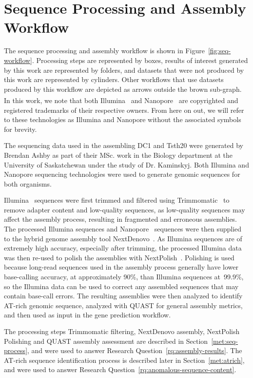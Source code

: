 \section{Sequence Processing and Assembly Workflow}\label{met:seq-workflow}

The sequence processing and assembly workflow is shown in Figure~\ref{fig:seq-workflow}. Processing steps are represented by boxes,
results of interest generated by this work are represented by folders,
and datasets that were not produced by this work are represented by
cylinders. Other workflows that use datasets produced by this workflow
are depicted as arrows outside the brown sub-graph. In this work, we note that both Illumina~\textsuperscript{\textcopyright\textregistered} and Nanopore~\textsuperscript{\textcopyright\textregistered} are copyrighted and registered trademarks of their respective owners. From here on out, we will refer to these technologies as Illumina and Nanopore without the associated symbols for brevity.

The sequencing data used in the assembling DC1 and Tsth20 were generated by Brendan Ashby as part of their MSc. work in the Biology department at the University of Saskatchewan under the study of Dr. Kaminskyj. Both Illumina and Nanopore sequencing technologies were used to generate genomic sequences for both organisms.

Illumina~\cite{bennett2004a} sequences were first trimmed and filtered using Trimmomatic~\cite{bolger2014a} to remove adapter content and low-quality sequences, as low-quality sequences may affect the assembly process, resulting in fragmented and erroneous assemblies. The processed Illumina sequences and Nanopore~\cite{wang2021a} sequences were then supplied to the hybrid genome assembly tool NextDenovo~\cite{hu2024a}. As Illumina sequences are of extremely high accuracy, especially after trimming, the processed Illumina data was then re-used to polish the assemblies with NextPolish~\cite{hu2020a}. Polishing is used because long-read sequences used in the assembly process generally have lower base-calling accuracy, at approximately 90\%, than Illumina sequences at~99.9\%, so the Illumina data can be used to correct any assembled sequences that may contain base-call errors. The resulting assemblies were then analyzed to identify AT-rich genomic sequence, analyzed with QUAST for general assembly metrics, and then used as input in the gene prediction workflow.

The processing steps Trimmomatic filtering, NextDenovo assembly,
NextPolish Polishing and QUAST assembly assessment are described in
Section~\ref{met:seq-process}, and were used to answer Research Question~\ref{rq:assembly-results}. The AT-rich sequence identification
process is described later in Section~\ref{met:atrich}, and were used to answer Research Question~\ref{rq:anomalous-sequence-content}. 

